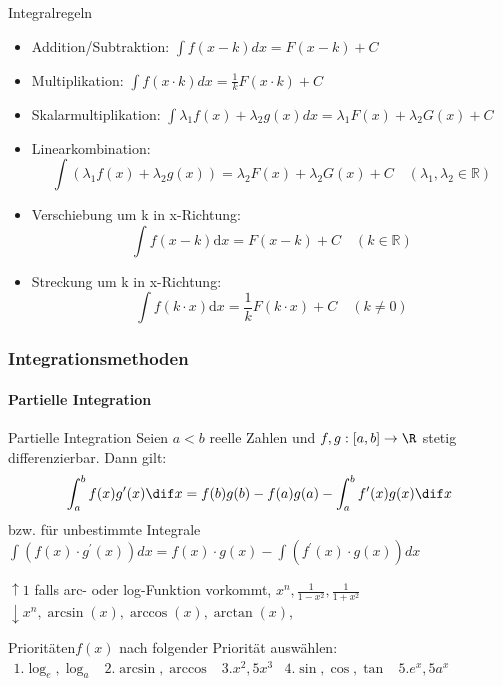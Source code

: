 \begin{concept}{Integralregeln}
    \begin{itemize}
      \item Addition/Subtraktion:
      $\int f(x-k) d x=F(x-k)+C$
      \item Multiplikation:
      $\int f(x \cdot k) d x=\frac{1}{k} F(x \cdot k)+C$
      \item Skalarmultiplikation:
      $\int \lambda_{1} f(x)+\lambda_{2} g(x) d x=\lambda_{1} F(x)+\lambda_{2} G(x)+C$
      \item Linearkombination: \[\int{(\lambda_1f(x)+\lambda_2g(x))} = \lambda_2F(x)+\lambda_2G(x)+C \quad (\lambda_1,\lambda_2 \in \mathbb{R} )\]
      \item Verschiebung um k in x-Richtung: \[\int{f(x-k)\mathrm{d}x}= F(x-k)+C \quad (k \in \mathbb{R}) \]
      \item Streckung um k in x-Richtung: \[\int{f(k\cdot x)\mathrm{d}x}= \frac{1}{k}F(k\cdot x)+C \quad (k\neq0 )\]
    \end{itemize}
\end{concept}



\subsubsection{Integrationsmethoden}
\paragraph{Partielle Integration}

\begin{concept}{Partielle Integration}
	Seien $a < b$ reelle Zahlen und $f,g:[a,b] \to \R$ stetig differenzierbar. Dann gilt:
   \begin{equation*}
	   \int_a^b f(x) g'(x) \dif x = f(b) g(b) - f(a) g(a) - \int_a^b f'(x)g(x) \dif x
   \end{equation*}
   bzw. für unbestimmte Integrale\\

   $
   \int(f(x) \cdot g^{\prime}(x)) d x=f(x) \cdot g(x)-\int(f^{\prime}(x) \cdot g(x)) d x
   $
\end{concept}
\begin{remark}
   $\uparrow 1$ falls arc- oder log-Funktion vorkommt, $x^{n}, \frac{1}{1-x^{2}}, \frac{1}{1+x^{2}}$\\

   $\downarrow x^{n}, \arcsin (x), \arccos (x), \arctan (x)$,
\end{remark}
\begin{KR}{Prioritäten}$f(x)$ nach folgender Priorität auswählen:\\
   $
   \begin{array}{lllll}
	   1. \log_e, \log_a  & 2. \arcsin, \arccos &  3. x^2, 5x^3 & 4. \sin, \cos, \tan & 5. e^x, 5a^x
   \end{array}
   $
\end{KR}

